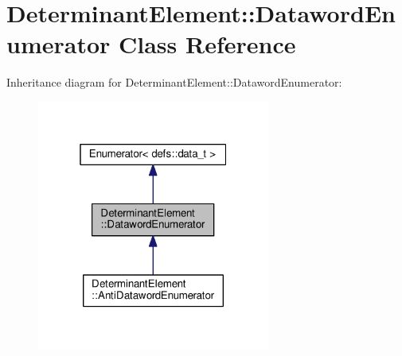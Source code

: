 \hypertarget{classDeterminantElement_1_1DatawordEnumerator}{}\section{Determinant\+Element\+:\+:Dataword\+Enumerator Class Reference}
\label{classDeterminantElement_1_1DatawordEnumerator}


Inheritance diagram for Determinant\+Element\+:\+:Dataword\+Enumerator\+:
\nopagebreak
\begin{figure}[H]
\begin{center}
\leavevmode
\includegraphics[width=217pt]{classDeterminantElement_1_1DatawordEnumerator__inherit__graph}
\end{center}
\end{figure}


